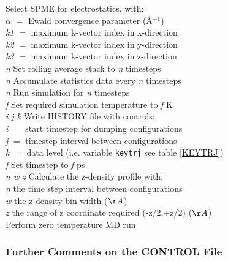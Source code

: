 \begin{tabbing}
\> \> Select SPME for electrostatics, with:\\
\> \> $\alpha$ $=$ Ewald convergence parameter (\AA$^{-1}$)\\
\> \> {\em k1} $=$ maximum k-vector index in x-direction\\
\> \> {\em k2} $=$ maximum k-vector index in y-direction\\
\> \> {\em k3} $=$ maximum k-vector index in z-direction\\
 {\em n} \> Set rolling average stack to {\em n}
timesteps \\
 {\em n} \> Accumulate statistics data every {\em n}
timesteps\\
 {\em n} \> Run simulation for {\em n} timesteps \\
 {\em f} \> Set required simulation temperature to {\em
f}  K\\
 {\em i j k} \> Write HISTORY file with controls:\\
\> \> {\em i} $=$ start timestep for dumping configurations\\
\> \> {\em j} $=$ timestep interval between  configurations\\
\> \> {\em k} $=$ data level (i.e. variable {\tt keytrj}
 see table \ref{KEYTRJ})\\
 {\em f} \> Set timestep to {\em f} ps\\
 {\em n w z}\> Calculate the z-density profile with:\\
\> \> {\em n} the time step interval between configurations\\
\> \> {\em w} the z-density bin width ($\AA$) \\
\> \> {\em z} the range of z coordinate required (-z/2,+z/2)  ($\AA$)\\
 \> Perform zero temperature MD run \\
\end{tabbing}

\subsubsection{Further Comments on the CONTROL File}

